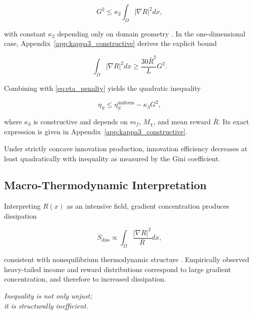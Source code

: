 \documentclass[12pt,a4paper]{article}
\theoremstyle{definition}
\begin{document}
\begin{equation}
  G^2
  \le
  \kappa_2
  \int_\Omega |\nabla R|^2 dx,
\end{equation}

with constant $\kappa_2$ depending only on domain geometry
\citep{lieb2001}.
In the one-dimensional case,
Appendix~\ref{app:kappa3_constructive} derives the explicit bound

\begin{equation}
  \int_\Omega |\nabla R|^2 dx
  \ge
  \frac{30 \bar R^2}{L}
  G^2.
\end{equation}

Combining with \eqref{eq:eta_penalty} yields the quadratic inequality

\begin{equation}
  \eta_S
  \le
  \eta_S^{\mathrm{uniform}}
  -
  \kappa_3 G^2,
  \label{eq:eta_gini_bound}
\end{equation}

where $\kappa_3$ is constructive and depends on
$m_f$, $M_\chi$, and mean reward $\bar R$.
Its exact expression is given in
Appendix~\ref{app:kappa3_constructive}.

\begin{theorem}
  Under strictly concave innovation production,
  innovation efficiency decreases at least quadratically
  with inequality as measured by the Gini coefficient.
\end{theorem}

\subsection{Macro-Thermodynamic Interpretation}

Interpreting $R(x)$ as an intensive field,
gradient concentration produces dissipation

\begin{equation}
  \dot{S}_{\mathrm{diss}}
  \propto
  \int_\Omega
  \frac{|\nabla R|^2}{R}
  dx,
\end{equation}

consistent with nonequilibrium thermodynamic structure
\citep{georgescu1971}.
Empirically observed heavy-tailed income and reward distributions
\citep{newman2005,atkinson2011,piketty2014}
correspond to large gradient concentration,
and therefore to increased dissipation.

\medskip
\begin{center}
  \itshape
  Inequality is not only unjust;\\
  it is structurally inefficient.
\end{center}
\end{document}
